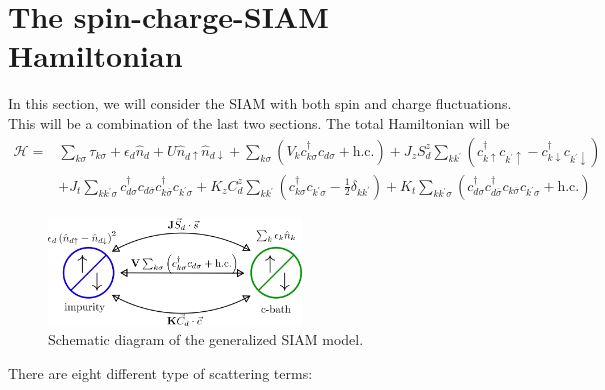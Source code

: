 \documentclass[twoside,11pt]{report}
\numberwithin{equation}{section}
\begin{document}
\section{The spin-charge-SIAM Hamiltonian}
In this section, we will consider the SIAM with both spin and charge fluctuations. This will be a combination of the last two sections. The total Hamiltonian will be
\begin{equation}\begin{aligned}
	\mathcal{H} =& \sum_{k\sigma}\tau_{k\sigma} + \epsilon_d \hat n_d + U \hat n_{d\uparrow}\hat n_{d \downarrow} + \sum_{k\sigma}\left( V_k c^\dagger_{k\sigma} c_{d\sigma} + \text{h.c.} \right) + J_z S_d^z\sum_{kk^\prime}\left( c^\dagger_{k \uparrow}c_{k^\prime \uparrow} - c^\dagger_{k \downarrow}c_{k^\prime \downarrow} \right) \\
	      &+ J_t \sum_{kk^\prime\sigma}c^\dagger_{d\sigma}c_{d\overline\sigma}c^\dagger_{k\overline\sigma}c_{k^\prime\sigma} + K_z C_d^z \sum_{kk^\prime}\left( c^\dagger_{k\sigma}c_{k^\prime\sigma} - \frac{1}{2}\delta_{kk^\prime} \right) + K_t \sum_{kk^\prime\sigma}\left(c^\dagger_{d\sigma}c^\dagger_{d\overline\sigma}c_{k\overline\sigma}c_{k^\prime\sigma}+\text{h.c.}\right)
\end{aligned}\end{equation}
\begin{figure}[htpb]
	\centering
	\includegraphics[width=0.6\textwidth]{../figures/gen_siam.png}
	\caption{Schematic diagram of the generalized SIAM model.}
\end{figure}
 There are eight different type of scattering terms:
\end{document}

